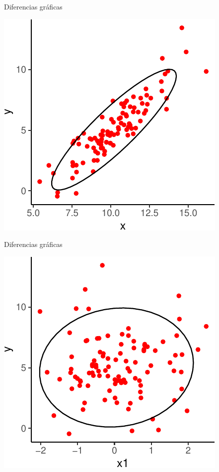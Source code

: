 \documentclass[
  11pt,
  ignorenonframetext,
]{beamer}
\begin{document}
\begin{frame}{Diferencias gráficas}
\protect\hypertarget{diferencias-gruxe1ficas}{}
\begin{center}\includegraphics{Regresion_files/figure-beamer/unnamed-chunk-1-1} \end{center}
\end{frame}

\begin{frame}{Diferencias gráficas}
\protect\hypertarget{diferencias-gruxe1ficas-1}{}
\begin{center}\includegraphics{Regresion_files/figure-beamer/unnamed-chunk-2-1} \end{center}
\end{frame}
\end{document}
